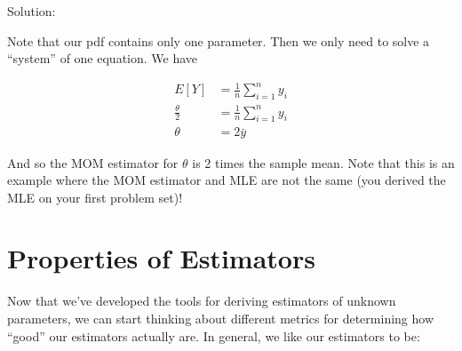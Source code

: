 \documentclass[
  letterpaper,
  DIV=11,
  numbers=noendperiod]{scrreprt}
\begin{document}
Solution:

Note that our pdf contains only one parameter. Then we only need to
solve a ``system'' of one equation. We have

\begin{align*}
  E[Y] & = \frac{1}{n} \sum_{i = 1}^n y_i \\
  \frac{\theta}{2} & = \frac{1}{n} \sum_{i = 1}^n y_i \\
  \theta & = 2 \bar{y}
\end{align*}

And so the MOM estimator for \(\theta\) is 2 times the sample mean. Note
that this is an example where the MOM estimator and MLE are not the same
(you derived the MLE on your first problem set)!


\chapter{Properties of Estimators}\label{properties-of-estimators}

Now that we've developed the tools for deriving estimators of unknown
parameters, we can start thinking about different metrics for
determining how ``good'' our estimators actually are. In general, we
like our estimators to be:
\end{document}
